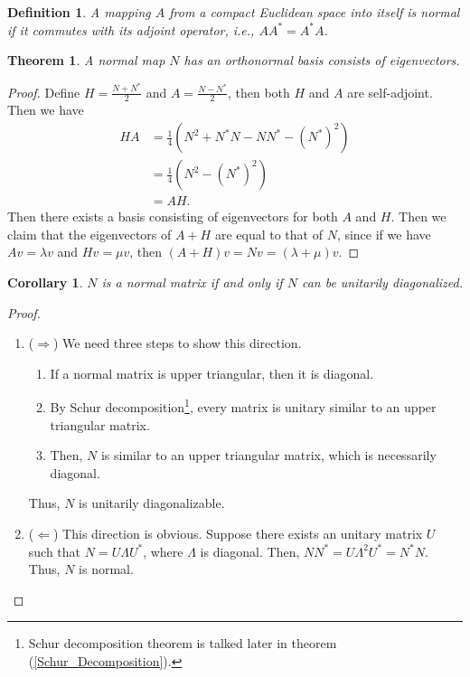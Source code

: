 \documentclass[11pt]{book}
\newtheorem{definition}{Definition}[section]
\newtheorem{theorem}{Theorem}[section]
\newtheorem{corollary}{Corollary}[section]
\theoremstyle{definition}
\numberwithin{equation}{subsection}
\begin{document}
\medskip

\begin{definition}
A mapping $A$ from a compact Euclidean space into itself is normal if it commutes with its adjoint operator, i.e., $AA^* = A^* A$.
\end{definition}

\medskip

\begin{theorem}
A normal map $N$ has an orthonormal basis consists of eigenvectors.
\end{theorem}
\begin{proof}
Define $H = \frac{N+N^*}{2}$ and $A = \frac{N-N^*}{2}$, then both $H$ and $A$ are self-adjoint. Then we have
\begin{align*}
    HA & = \frac{1}{4}\left(N^2 + N^*N - NN^* - \left(N^*\right)^2 \right) \\
    & = \frac{1}{4}\left(N^2 - \left(N^*\right)^2 \right)\\
    & = AH.
\end{align*}
Then there exists a basis consisting of eigenvectors for both $A$ and $H$. Then we claim that the eigenvectors of $A+H$ are equal to that of $N$, since if we have $Av = \lambda v$ and $Hv = \mu v$, then $(A+H)v = N v = (\lambda + \mu)v$.
\end{proof}

\medskip

\begin{corollary}
$N$ is a normal matrix if and only if $N$ can be unitarily diagonalized.
\end{corollary}
\begin{proof}
~\begin{enumerate}[label=(\arabic*)]
    \item ($\Rightarrow$) We need three steps to show this direction\cite{25}.
    \begin{enumerate}[label=(\alph*)]
        \item If a normal matrix is upper triangular, then it is diagonal.
        
        \item By Schur decomposition\footnote{Schur decomposition theorem is talked later in theorem (\ref{Schur_Decomposition}).}, every matrix is unitary similar to an upper triangular matrix.
        
        \item Then, $N$ is similar to an upper triangular matrix, which is necessarily diagonal.
    \end{enumerate}
    Thus, $N$ is unitarily diagonalizable. 
    
    \item ($\Leftarrow$) This direction is obvious. Suppose there exists an unitary matrix $U$ such that $N = U \Lambda U^*$, where $\Lambda$ is diagonal. Then, $N N^* = U \Lambda^2 U^* = N^* N$. Thus, $N$ is normal.
\end{enumerate}
\end{proof}
\end{document}
